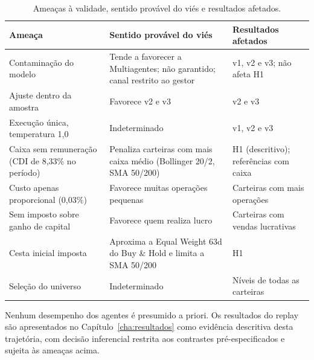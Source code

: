 \begin{table}[htbp]
\centering
\caption{Ameaças à validade, sentido provável do viés e resultados afetados.}
\label{tab:met-ameacas}
\small
\begin{tabular}{>{\raggedright\arraybackslash}p{3.6cm} >{\raggedright\arraybackslash}p{5.8cm} >{\raggedright\arraybackslash}p{4.6cm}}
\toprule
\textbf{Ameaça} & \textbf{Sentido provável do viés} & \textbf{Resultados afetados} \\
\midrule
Contaminação do modelo & Tende a favorecer a Multiagentes; não garantido; canal restrito ao gestor & v1, v2 e v3; não afeta H1 \\
Ajuste dentro da amostra & Favorece v2 e v3 & v2 e v3 \\
Execução única, temperatura 1,0 & Indeterminado & v1, v2 e v3 \\
Caixa sem remuneração (CDI de 8,33\% no período) & Penaliza carteiras com mais caixa médio (Bollinger 20/2, SMA 50/200) & H1 (descritivo); referências com caixa \\
Custo apenas proporcional (0,03\%) & Favorece muitas operações pequenas & Carteiras com mais operações \\
Sem imposto sobre ganho de capital & Favorece quem realiza lucro & Carteiras com vendas lucrativas \\
Cesta inicial imposta & Aproxima a Equal Weight 63d do Buy \& Hold e limita a SMA 50/200 & H1 \\
Seleção do universo & Indeterminado & Níveis de todas as carteiras \\
\bottomrule
\end{tabular}
\end{table}

Nenhum desempenho dos agentes é presumido a priori. Os resultados do replay são apresentados no Capítulo~\ref{cha:resultados} como evidência descritiva desta trajetória, com decisão inferencial restrita aos contrastes pré-especificados e sujeita às ameaças acima.
